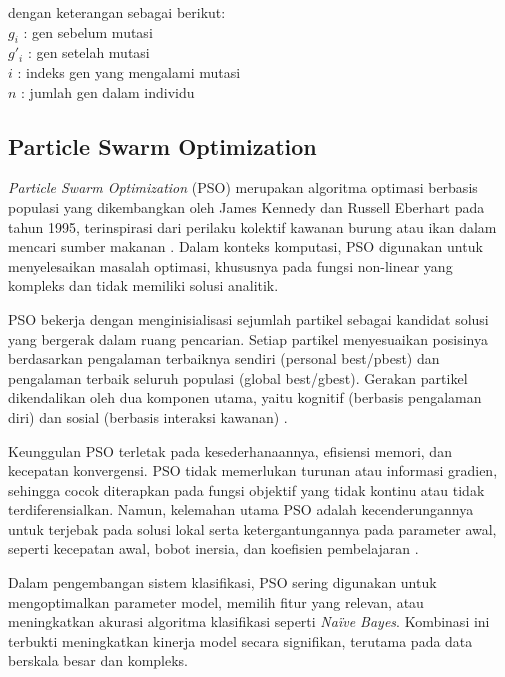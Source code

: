 dengan keterangan sebagai berikut:\\[0.5em]
\hspace*{1.5em}$g_i$ : gen sebelum mutasi\\
\hspace*{1.5em}$g'_i$ : gen setelah mutasi\\
\hspace*{1.5em}$i$ : indeks gen yang mengalami mutasi\\
\hspace*{1.5em}$n$ : jumlah gen dalam individu
\vspace{0.5em}
\noindent

\subsection{Particle Swarm Optimization} \label{II.Particle Swarm Optimization}
\textit{Particle Swarm Optimization} (PSO) merupakan algoritma optimasi berbasis populasi yang dikembangkan oleh James Kennedy dan Russell Eberhart pada tahun 1995, terinspirasi dari perilaku kolektif kawanan burung atau ikan dalam mencari sumber makanan \cite{Juneja2016ParticleSO}\cite{Santosa2006TUTORIALPS}. Dalam konteks komputasi, PSO digunakan untuk menyelesaikan masalah optimasi, khususnya pada fungsi non-linear yang kompleks dan tidak memiliki solusi analitik.

PSO bekerja dengan menginisialisasi sejumlah partikel sebagai kandidat solusi yang bergerak dalam ruang pencarian. Setiap partikel menyesuaikan posisinya berdasarkan pengalaman terbaiknya sendiri (personal best/pbest) dan pengalaman terbaik seluruh populasi (global best/gbest). Gerakan partikel dikendalikan oleh dua komponen utama, yaitu kognitif (berbasis pengalaman diri) dan sosial (berbasis interaksi kawanan) \cite{Cai09}.

Keunggulan PSO terletak pada kesederhanaannya, efisiensi memori, dan kecepatan konvergensi. PSO tidak memerlukan turunan atau informasi gradien, sehingga cocok diterapkan pada fungsi objektif yang tidak kontinu atau tidak terdiferensialkan. Namun, kelemahan utama PSO adalah kecenderungannya untuk terjebak pada solusi lokal serta ketergantungannya pada parameter awal, seperti kecepatan awal, bobot inersia, dan koefisien pembelajaran \cite{Yeh2008}.

Dalam pengembangan sistem klasifikasi, PSO sering digunakan untuk mengoptimalkan parameter model, memilih fitur yang relevan, atau meningkatkan akurasi algoritma klasifikasi seperti \textit{Naïve Bayes}. Kombinasi ini terbukti meningkatkan kinerja model secara signifikan, terutama pada data berskala besar dan kompleks.


